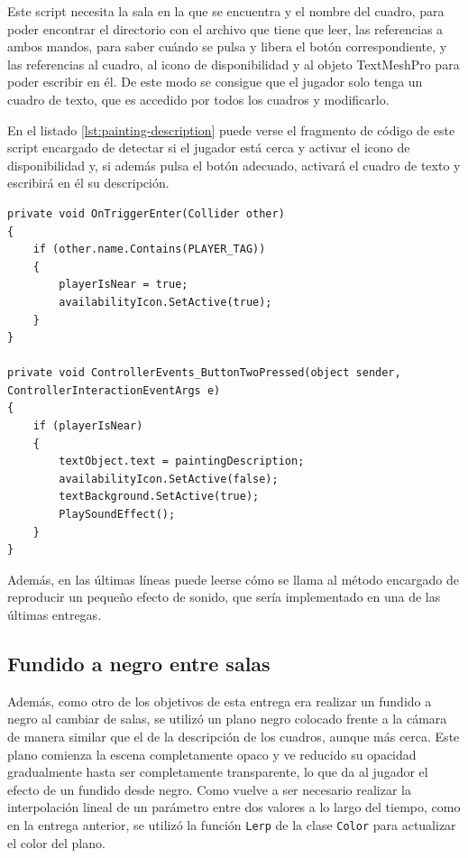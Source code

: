 Este script necesita la sala en la que se encuentra y el nombre del cuadro, para poder encontrar el directorio con el archivo que tiene que leer, las referencias a ambos mandos, para saber cuándo se pulsa y libera el botón correspondiente, y las referencias al cuadro, al icono de disponibilidad y al objeto TextMeshPro para poder escribir en él. De este modo se consigue que el jugador solo tenga un cuadro de texto, que es accedido por todos los cuadros y modificarlo.

En el listado \ref{lst:painting-description} puede verse el fragmento de código de este script encargado de detectar si el jugador está cerca y activar el icono de disponibilidad y, si además pulsa el botón adecuado, activará el cuadro de texto y escribirá en él su descripción.

\begin{lstlisting}[caption=Fragmento del script para activar la descripción de los cuadros, label=lst:painting-description]
private void OnTriggerEnter(Collider other)
{
    if (other.name.Contains(PLAYER_TAG))
    {
        playerIsNear = true;
        availabilityIcon.SetActive(true);
    }
}
    
private void ControllerEvents_ButtonTwoPressed(object sender, ControllerInteractionEventArgs e)
{
    if (playerIsNear)
    {
        textObject.text = paintingDescription;
        availabilityIcon.SetActive(false);
        textBackground.SetActive(true);
        PlaySoundEffect();
    }
}
\end{lstlisting}

Además, en las últimas líneas puede leerse cómo se llama al método encargado de reproducir un pequeño efecto de sonido, que sería implementado en una de las últimas entregas.

\subsection{Fundido a negro entre salas}

Además, como otro de los objetivos de esta entrega era realizar un fundido a negro al cambiar de salas, se utilizó un plano negro colocado frente a la cámara de manera similar que el de la descripción de los cuadros, aunque más cerca. Este plano comienza la escena completamente opaco y ve reducido su opacidad gradualmente hasta ser completamente transparente, lo que da al jugador el efecto de un fundido desde negro. Como vuelve a ser necesario realizar la interpolación lineal de un parámetro entre dos valores a lo largo del tiempo, como en la entrega anterior, se utilizó la función \texttt{Lerp} de la clase \texttt{Color} para actualizar el color del plano.

